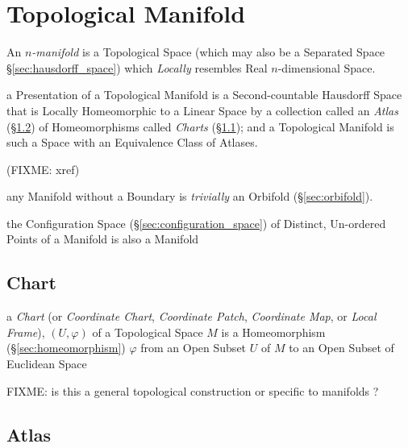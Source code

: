 \section{Topological Manifold}\label{sec:topological_manifold}

An \emph{$n$-manifold} is a Topological Space (which may also be a Separated
Space \S\ref{sec:hausdorff_space}) which \emph{Locally} resembles Real
$n$-dimensional Space.

a Presentation of a Topological Manifold is a Second-countable Hausdorff Space
that is Locally Homeomorphic to a Linear Space by a collection called an
\emph{Atlas} (\S\ref{sec:atlas}) of Homeomorphisms called \emph{Charts}
(\S\ref{sec:chart}); and a Topological Manifold is such a Space with an
Equivalence Class of Atlases.

(FIXME: xref)

\fist any Manifold without a Boundary is \emph{trivially} an Orbifold
(\S\ref{sec:orbifold}).

the Configuration Space (\S\ref{sec:configuration_space}) of Distinct,
Un-ordered Points of a Manifold is also a Manifold



\subsection{Chart}\label{sec:chart}

a \emph{Chart} (or \emph{Coordinate Chart}, \emph{Coordinate Patch},
\emph{Coordinate Map}, or \emph{Local Frame}), $(U, \varphi)$ of a Topological
Space $M$ is a Homeomorphism (\S\ref{sec:homeomorphism}) $\varphi$ from an Open
Subset $U$ of $M$ to an Open Subset of Euclidean Space

FIXME: is this a general topological construction or specific to manifolds ?



\subsection{Atlas}\label{sec:atlas}

